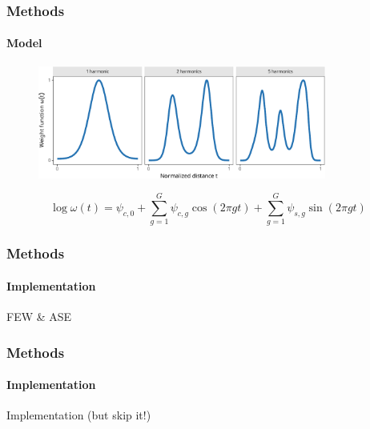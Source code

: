 \documentclass{snedecorbeamer}
\begin{document}
\begin{frame}
  \frametitle{Methods}
  \framesubtitle{Model}








  \begin{figure}
    \centering
    \includegraphics[height=10em]{inc/few_weight_profiles}
  \end{figure}

  \begin{equation}
    \log\omega(t)
    \label{eq:few-log}
    =\psi_{c,0} + \sum_{g = 1}^{G} \psi_{c,g}\cos\left(2\pi gt\right)
      + \sum_{g = 1}^{G} \psi_{s,g}\sin\left(2\pi gt\right)
  \end{equation}

\end{frame}

\begin{frame}
  \frametitle{Methods}
  \framesubtitle{Implementation}

  FEW \& ASE
\end{frame}

\begin{frame}
  \frametitle{Methods}
  \framesubtitle{Implementation}

  Implementation (but skip it!)
\end{frame}
\end{document}
